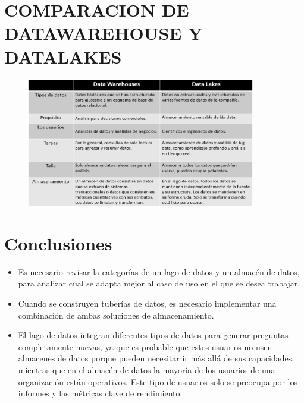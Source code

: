 \documentclass[%
 reprint,
 amsmath,amssymb,
 aps,
]{revtex4-1}
\begin{document}
\section{COMPARACION DE DATAWAREHOUSE Y DATALAKES \cite{referenciatorres1} \cite{referenciatorres2}}	
\begin{figure}[htb]
				\begin{center}
					\includegraphics[width=10cm]{./IMAGENES/Imagen1}
				\end{center}
			\end{figure}


\section{Conclusiones}

\begin{itemize}
\item Es necesario revisar la categorías de un lago de datos y un almacén de datos, para analizar cual se adapta mejor al caso de uso en el que se desea trabajar.
\item Cuando se construyen tuberías de datos, es necesario implementar una combinación de ambas soluciones de almacenamiento.
\item El lago de datos integran diferentes tipos de datos para generar preguntas completamente nuevas, ya que es probable que estos usuarios no usen almacenes de datos porque pueden necesitar ir más allá de sus capacidades, mientras que en el almacén de datos la mayoría de los usuarios de una organización están operativos. Este tipo de usuarios solo se preocupa por los informes y las métricas clave de rendimiento. 

\end{itemize}






\end{document}
